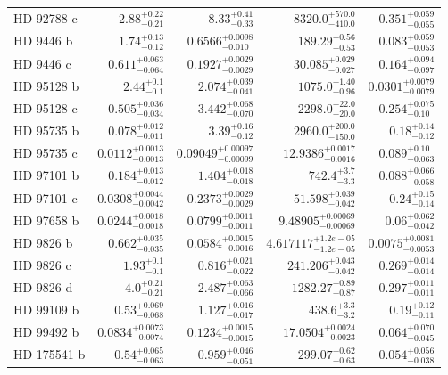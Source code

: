 \begin{longtable*}{lrrrr}
HD 92788 c & $2.88^{+0.22}_{-0.21}$ & $8.33^{+0.41}_{-0.33}$ & $8320.0^{+570.0}_{-410.0}$ & $0.351^{+0.059}_{-0.055}$ \\ 
HD 9446 b & $1.74^{+0.13}_{-0.12}$ & $0.6566^{+0.0098}_{-0.010}$ & $189.29^{+0.56}_{-0.53}$ & $0.083^{+0.059}_{-0.053}$ \\ 
HD 9446 c & $0.611^{+0.063}_{-0.064}$ & $0.1927^{+0.0029}_{-0.0029}$ & $30.085^{+0.029}_{-0.027}$ & $0.164^{+0.094}_{-0.097}$ \\ 
HD 95128 b & $2.44^{+0.1}_{-0.1}$ & $2.074^{+0.039}_{-0.041}$ & $1075.0^{+1.40}_{-0.96}$ & $0.0301^{+0.0079}_{-0.0079}$ \\ 
HD 95128 c & $0.505^{+0.036}_{-0.034}$ & $3.442^{+0.068}_{-0.070}$ & $2298.0^{+22.0}_{-20.0}$ & $0.254^{+0.075}_{-0.10}$ \\ 
HD 95735 b & $0.078^{+0.012}_{-0.011}$ & $3.39^{+0.16}_{-0.12}$ & $2960.0^{+200.0}_{-150.0}$ & $0.18^{+0.14}_{-0.12}$ \\ 
HD 95735 c & $0.0112^{+0.0013}_{-0.0013}$ & $0.09049^{+0.00097}_{-0.00099}$ & $12.9386^{+0.0017}_{-0.0016}$ & $0.089^{+0.10}_{-0.063}$ \\ 
HD 97101 b & $0.184^{+0.013}_{-0.012}$ & $1.404^{+0.018}_{-0.018}$ & $742.4^{+3.7}_{-3.3}$ & $0.088^{+0.066}_{-0.058}$ \\ 
HD 97101 c & $0.0308^{+0.0044}_{-0.0042}$ & $0.2373^{+0.0029}_{-0.0029}$ & $51.598^{+0.039}_{-0.042}$ & $0.24^{+0.15}_{-0.14}$ \\ 
HD 97658 b & $0.0244^{+0.0018}_{-0.0018}$ & $0.0799^{+0.0011}_{-0.0011}$ & $9.48905^{+0.00069}_{-0.00069}$ & $0.06^{+0.062}_{-0.042}$ \\ 
HD 9826 b & $0.662^{+0.035}_{-0.035}$ & $0.0584^{+0.0015}_{-0.0016}$ & $4.617117^{+1.2e-05}_{-1.2e-05}$ & $0.0075^{+0.0081}_{-0.0053}$ \\ 
HD 9826 c & $1.93^{+0.1}_{-0.1}$ & $0.816^{+0.021}_{-0.022}$ & $241.206^{+0.043}_{-0.042}$ & $0.269^{+0.014}_{-0.014}$ \\ 
HD 9826 d & $4.0^{+0.21}_{-0.21}$ & $2.487^{+0.063}_{-0.066}$ & $1282.27^{+0.89}_{-0.87}$ & $0.297^{+0.011}_{-0.011}$ \\ 
HD 99109 b & $0.53^{+0.069}_{-0.068}$ & $1.127^{+0.016}_{-0.017}$ & $438.6^{+3.3}_{-3.2}$ & $0.19^{+0.12}_{-0.11}$ \\ 
HD 99492 b & $0.0834^{+0.0073}_{-0.0074}$ & $0.1234^{+0.0015}_{-0.0015}$ & $17.0504^{+0.0024}_{-0.0023}$ & $0.064^{+0.070}_{-0.045}$ \\ 
HD 175541 b & $0.54^{+0.065}_{-0.063}$ & $0.959^{+0.046}_{-0.051}$ & $299.07^{+0.62}_{-0.63}$ & $0.054^{+0.056}_{-0.038}$ \\ 

\end{longtable*}
